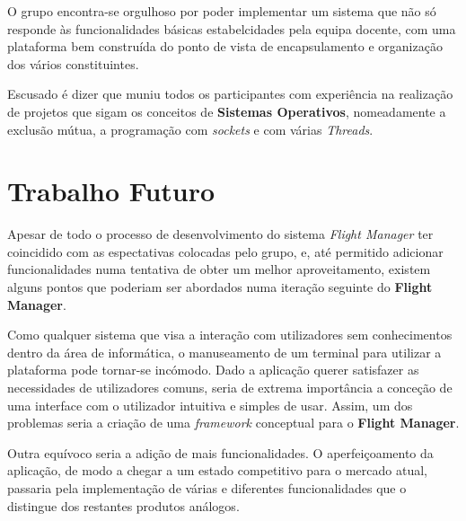 \documentclass[a4paper,11pt]{scrreprt}
\begin{document}
O grupo encontra-se orgulhoso por poder implementar um sistema que não só responde às funcionalidades 
básicas estabelcidades pela equipa docente, com uma plataforma bem construída do ponto de vista
de encapsulamento e organização dos vários constituintes.

Escusado é dizer que muniu todos os participantes com experiência na realização de projetos que sigam 
os conceitos de \textbf{Sistemas Operativos}, nomeadamente a exclusão mútua, a programação com \textit{sockets} e
com várias \textit{Threads}.

\section{Trabalho Futuro}

Apesar de todo o processo de desenvolvimento do sistema \textit{Flight Manager} ter coincidido com as espectativas
colocadas pelo grupo, e, até permitido adicionar funcionalidades numa tentativa de obter um melhor aproveitamento,
existem alguns pontos que poderiam ser abordados numa iteração seguinte do \textbf{Flight Manager}.

Como qualquer sistema que visa a interação com utilizadores sem conhecimentos dentro da área de informática, o 
manuseamento de um terminal para utilizar a plataforma pode tornar-se incómodo.
Dado a aplicação querer satisfazer as necessidades de utilizadores comuns, seria de extrema importância a conceção
de uma interface com o utilizador intuitiva e simples de usar.
Assim, um dos problemas seria a criação de uma \textit{framework} conceptual para o \textbf{Flight Manager}.

Outra equívoco seria a adição de mais funcionalidades. 
O aperfeiçoamento da aplicação, de modo a chegar a um estado competitivo para o mercado atual, passaria pela
implementação de várias e diferentes funcionalidades que o distingue dos restantes produtos análogos.


\renewcommand{\nomname}{Lista de Siglas e Acrónimos}

\renewcommand{\nompreamble}{}

\end{document}
